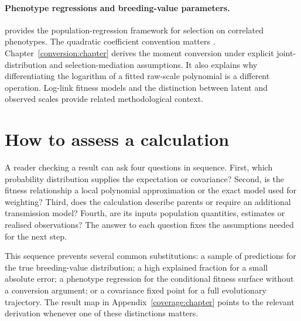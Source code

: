 \paragraph{Phenotype regressions and breeding-value parameters.}
\citet{LandeArnold1983} provides the population-regression framework for selection on correlated phenotypes. The quadratic coefficient convention matters \citep{StinchcombeEtAl2008}. Chapter~\ref{conversion:chapter} derives the moment conversion under explicit joint-distribution and selection-mediation assumptions. It also explains why differentiating the logarithm of a fitted raw-scale polynomial is a different operation. Log-link fitness models \citep{MorrisseyGoudie2022} and the distinction between latent and observed scales \citep{deVillemereuilEtAl2016} provide related methodological context.

\section{How to assess a calculation}

A reader checking a result can ask four questions in sequence. First, which probability distribution supplies the expectation or covariance? Second, is the fitness relationship a local polynomial approximation or the exact model used for weighting? Third, does the calculation describe parents or require an additional transmission model? Fourth, are its inputs population quantities, estimates or realised observations? The answer to each question fixes the assumptions needed for the next step.

This sequence prevents several common substitutions: a sample of predictions for the true breeding-value distribution; a high explained fraction for a small absolute error; a phenotype regression for the conditional fitness surface without a conversion argument; or a covariance fixed point for a full evolutionary trajectory. The result map in Appendix~\ref{coverage:chapter} points to the relevant derivation whenever one of these distinctions matters.
